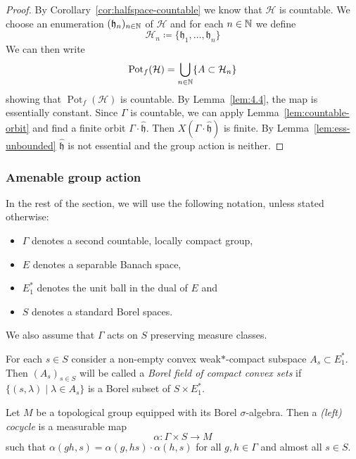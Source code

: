 \begin{proof}
  By Corollary~\ref{cor:halfspace-countable} we know that \(\mathcal{H}\) is countable. We choose an enumeration \((\mathfrak{h}_n)_{n \in \mathbb{N}}\) of \(\mathcal{H}\) and for each \(n \in \mathbb{N}\) we define
  \[
    \mathcal{H}_n \coloneqq \{\mathfrak{h}_1, \dots, \mathfrak{h}_n\}
  \]
  We can then write
  \[
    \operatorname{Pot}_f(\mathcal{H}) = \bigcup_{n \in \mathbb{N}} \{A \subset \mathcal{H}_n\}
  \]
  showing that \(\operatorname{Pot}_f(\mathcal{H})\) is countable. By Lemma~\ref{lem:4.4}, the map is essentially constant. Since \(\Gamma\) is countable, we can apply Lemma~\ref{lem:countable-orbit} and find a finite orbit \(\Gamma\cdot \mathfrak{\hat h}\). Then \(X(\Gamma \cdot \mathfrak{\hat h})\) is finite. By Lemma~\ref{lem:ess-unbounded} \(\mathfrak{\hat h}\) is not essential and the group action is neither.
\end{proof}

\subsubsection*{Amenable group action}
\label{sec:amenable}

In the rest of the section, we will use the following notation, unless stated otherwise:
\begin{itemize}
\item \(\Gamma\) denotes a second countable, locally compact group,
\item \(E\) denotes a separable Banach space,
\item \(E^\ast_1\) denotes the unit ball in the dual of \(E\) and
\item \(S\) denotes a standard Borel spaces.
\end{itemize}
We also assume that \(\Gamma\) acts on \(S\) preserving measure classes.


\begin{defin}
  For each \(s \in S\) consider a non-empty convex weak\(\ast\)-compact subspace \(A_s \subset E^\ast_1\). Then \((A_s)_{s \in S}\) will be called a \emph{Borel field of compact convex sets} if \(\{(s, \lambda) \mid \lambda \in A_s\}\) is a Borel subset of \(S \times E^\ast_1\).  
\end{defin}

\begin{defin}
  Let \(M\) be a topological group equipped with its Borel \(\sigma\)-algebra. Then a \emph{(left) cocycle} is a measurable map
  \[
    \alpha \colon \Gamma \times S \to M
  \]
  such that \(\alpha(gh, s) = \alpha(g, hs)\cdot \alpha(h, s)\) for all \(g, h \in \Gamma\) and almost all \(s \in S\).
\end{defin}

